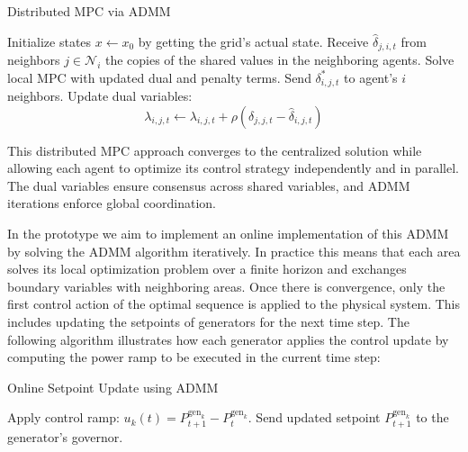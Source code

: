\documentclass{article}
\begin{document}
\begin{algorithm}[H]
\caption{Distributed MPC via ADMM}
\begin{algorithmic}[1]
    \State Initialize states $x \gets x_0$ by getting the grid's actual state.
            \State Receive $\hat{\delta}_{j,i,t}$ from neighbors $j \in \mathcal{N}_i$ the copies of the shared values in the neighboring agents.
            \State Solve local MPC with updated dual and penalty terms.
            \State Send $\delta^*_{i,j,t}$ to agent's $i$ neighbors. 
        \EndFor
            \State Update dual variables:
            \[
                \lambda_{i,j,t} \gets \lambda_{i,j,t} + \rho (\delta_{j,j,t} - \hat{\delta}_{i,j,t})
            \]
        \EndFor
    \EndWhile
\end{algorithmic}
\end{algorithm}

This distributed MPC approach converges to the centralized solution while allowing each agent to optimize its control strategy independently and in parallel. The dual variables ensure consensus across shared variables, and ADMM iterations enforce global coordination. 

In the prototype we aim to implement an online implementation of this ADMM by solving the ADMM algorithm iteratively. In practice this means that each area solves its local optimization problem over a finite horizon and exchanges boundary variables  with neighboring areas. Once there is convergence, only the first control action of the optimal sequence is applied to the physical system. This includes updating the setpoints of generators for the next time step. The following algorithm illustrates how each generator applies the control update by computing the power ramp to be executed in the current time step:

\begin{algorithm}
\caption{Online Setpoint Update using ADMM}
\begin{algorithmic}
        \State Apply control ramp: $u_k(t) = P^{\text{gen}_k}_{t+1} - P^{\text{gen}_k}_t$.
        \State Send updated setpoint $P^{\text{gen}_k}_{t+1}$ to the generator's governor.
    \EndFor
\end{algorithmic}
\end{algorithm}

\newpage
\clearpage
\nocite{*}  
\printbibliography
\end{document}
